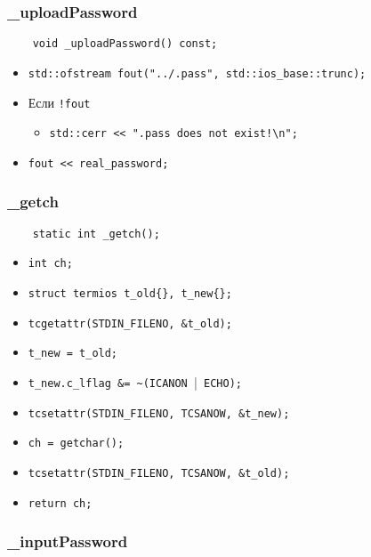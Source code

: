 \subsubsection{\_uploadPassword}

\begin{lstlisting}
    void _uploadPassword() const;
\end{lstlisting}

\begin{itemize}
    \item \verb|std::ofstream fout("../.pass", std::ios_base::trunc);|
    \item Если \verb|!fout|
    \begin{itemize}
        \item \verb|std::cerr << ".pass does not exist!\n";|
    \end{itemize}
    \item \verb|fout << real_password;|
\end{itemize}

\subsubsection{\_getch}

\begin{lstlisting}
    static int _getch();
\end{lstlisting}

\begin{itemize}
    \item \verb|int ch;|
    \item \verb|struct termios t_old{}, t_new{};|
    \item \verb|tcgetattr(STDIN_FILENO, &t_old);|
    \item \verb|t_new = t_old;|
    \item \verb|t_new.c_lflag &= ~(ICANON ||\verb| ECHO);|
    \item \verb|tcsetattr(STDIN_FILENO, TCSANOW, &t_new);|
    \item \verb|ch = getchar();|
    \item \verb|tcsetattr(STDIN_FILENO, TCSANOW, &t_old);|
    \item \verb|return ch;|
\end{itemize}

\subsubsection{\_inputPassword}

